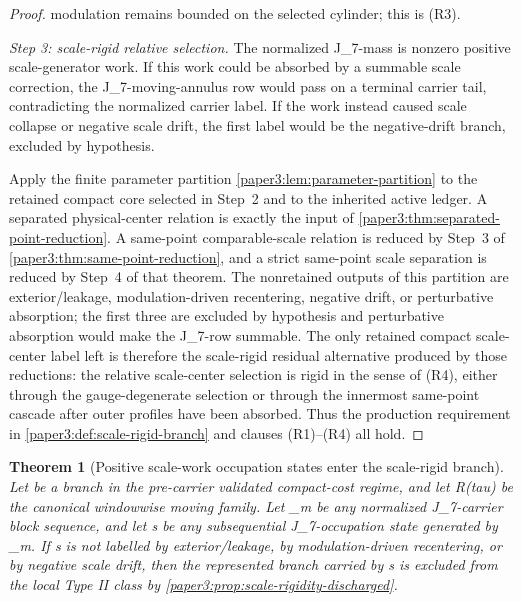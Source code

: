 \documentclass[11pt]{amsart}
\def\({}%
\def\){}%
\def\mathfrak#1{#1}%
\def\tau{tau}%
\theoremstyle{plain}
\newtheorem{theorem}{Theorem}[section]
\theoremstyle{definition}
\theoremstyle{remark}
\begin{document}
\begin{proof}
modulation remains bounded on the selected cylinder; this is (R3).
\par
\emph{Step 3: scale-rigid relative selection.}  The normalized \(J_7\)-mass is
nonzero positive scale-generator work.  If this work could be absorbed by a
summable scale correction, the \(J_7\)-moving-annulus row would pass on a
terminal carrier tail, contradicting the normalized carrier label.  If the
work instead caused scale collapse or negative scale drift, the first label
would be the negative-drift branch, excluded by hypothesis.
\par
Apply the finite parameter partition
\cref{paper3:lem:parameter-partition} to the retained compact core selected in
Step~2 and to the inherited active ledger.  A separated physical-center
relation is exactly the input of
\cref{paper3:thm:separated-point-reduction}.  A same-point comparable-scale
relation is reduced by Step~3 of
\cref{paper3:thm:same-point-reduction}, and a strict same-point scale
separation is reduced by Step~4 of that theorem.  The nonretained outputs of
this partition are exterior/leakage, modulation-driven recentering, negative
drift, or perturbative absorption; the first three are excluded by hypothesis
and perturbative absorption would make the \(J_7\)-row summable.  The only
retained compact scale-center label left is therefore the scale-rigid residual
alternative produced by those reductions: the relative scale-center selection
is rigid in the sense of (R4), either through the gauge-degenerate selection or
through the innermost same-point cascade after outer profiles have been
absorbed.  Thus the production requirement in
\cref{paper3:def:scale-rigid-branch} and clauses (R1)--(R4) all hold.
\end{proof}

\begin{theorem}[Positive scale-work occupation states enter the scale-rigid branch]
\label{paper7:thm:positive-scale-certificate-enters-scale-rigid}
Let \(\omega\) be a branch in the pre-carrier validated compact-cost regime,
and let \(R(\tau)\) be the canonical windowwise moving family.  Let
\(\mu_m\) be any normalized \(J_7\)-carrier block sequence, and let
\(\mathfrak s\) be any subsequential \(J_7\)-occupation state generated by
\(\mu_m\).  If \(\mathfrak s\) is not labelled by exterior/leakage, by
modulation-driven recentering, or by negative scale drift, then the represented
branch carried by \(\mathfrak s\) is excluded from the local Type II class by
\cref{paper3:prop:scale-rigidity-discharged}.
\end{theorem}
\end{document}
